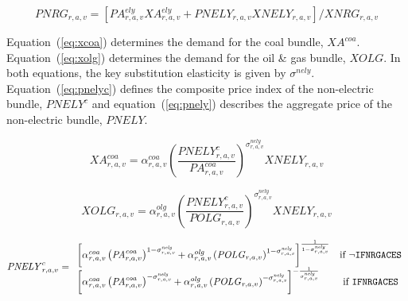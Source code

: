 \documentclass[11pt,letterpaper]{report}
\begin{document}
\begin{equation}
\label{eq:pnrg}
\mathit{PNRG}_{r,a,v} = \left[\mathit{PA}^{\mathit{ely}}_{r,a,v} \mathit{XA}^{\mathit{ely}}_{r,a,v}
+ \mathit{PNELY}_{r,a,v}  \mathit{XNELY}_{r,a,v} \right] \bigg / \mathit{XNRG}_{r,a,v}
\end{equation}

Equation~(\ref{eq:xcoa}) determines the demand for the coal bundle,
$\mathit{XA^{\mathit{coa}}}$. Equation~(\ref{eq:xolg}) determines the demand for
the oil \& gas bundle, $\mathit{XOLG}$. In both equations, the key substitution
elasticity is given by $\sigma^{\mathit{nely}}$. Equation~(\ref{eq:pnelyc})
defines the composite price index of the non-electric bundle, $\mathit{PNELY}^c$
and equation~(\ref{eq:pnely}) describes the aggregate price of the non-electric bundle, $\mathit{PNELY}$.

\begin{equation}
\label{eq:xcoa}
\mathit{XA}^{\mathit{coa}}_{r,a,v} =
   \alpha^{\mathit{coa}}_{\mathit{r,a,v}}
   \left( \frac {\mathit{PNELY}^c_{r,a,v}} {\mathit{PA}^{\mathit{coa}}_{r,a,v}}
   \right)^{\sigma^{\mathit{nely}}_{\mathit{r,a,v}}}
   \mathit{XNELY}_{r,a,v}
\end{equation}

\begin{equation}
\label{eq:xolg}
\mathit{XOLG}_{r,a,v} =
   \alpha^{\mathit{olg}}_{\mathit{r,a,v}}
   \left( \frac {\mathit{PNELY}^c_{r,a,v}} {\mathit{POLG}_{r,a,v}}
   \right)^{\sigma^{\mathit{nely}}_{\mathit{r,a,v}}}
   \mathit{XNELY}_{r,a,v}
\end{equation}

\begin{equation}
\label{eq:pnelyc}
\mathit{PNELY}^c_{r,a,v} =
\begin{array}{l c l}
   \left[
      \alpha^{\mathit{coa}}_{\mathit{r,a,v}}
      \left( \mathit{PA}^{\mathit{coa}}_{r,a,v}
      \right)^{1 - \sigma^{\mathit{nely}}_{\mathit{r,a,v}}}
   +  \alpha^{\mathit{olg}}_{\mathit{r,a,v}}
      \left( \mathit{POLG}_{r,a,v}
      \right)^{1 - \sigma^{\mathit{nely}}_{\mathit{r,a,v}}}
   \right]^{\frac{1} {1 - \sigma^{\mathit{nely}}_{\mathit{r,a,v}}}} &
	\textrm{if } \lnot \texttt{IFNRGACES} \\
   \left[
      \alpha^{\mathit{coa}}_{\mathit{r,a,v}}
            \left( \mathit{PA}^{\mathit{coa}}_{r,a,v}
            \right)^{- \sigma^{\mathit{nely}}_{\mathit{r,a,v}}}
         +  \alpha^{\mathit{olg}}_{\mathit{r,a,v}}
            \left( \mathit{POLG}_{r,a,v}
            \right)^{- \sigma^{\mathit{nely}}_{\mathit{r,a,v}}}
         \right]^{-\frac{1} {\sigma^{\mathit{nely}}_{\mathit{r,a,v}}}} &
	\textrm{if } \texttt{IFNRGACES} \\
\end{array}
\end{equation}
\end{document}
